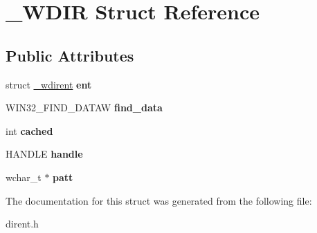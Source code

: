 \hypertarget{struct___w_d_i_r}{\section{\-\_\-\-W\-D\-I\-R Struct Reference}
\label{struct___w_d_i_r}
}
\subsection*{Public Attributes}
\begin{DoxyCompactItemize}
\item 
\hypertarget{struct___w_d_i_r_a84ae1457352005f813ed4b3dc1994b62}{struct \hyperlink{struct__wdirent}{\-\_\-wdirent} {\bfseries ent}}\label{struct___w_d_i_r_a84ae1457352005f813ed4b3dc1994b62}

\item 
\hypertarget{struct___w_d_i_r_a2e2f2680de3f93c30245e482d2b714fa}{W\-I\-N32\-\_\-\-F\-I\-N\-D\-\_\-\-D\-A\-T\-A\-W {\bfseries find\-\_\-data}}\label{struct___w_d_i_r_a2e2f2680de3f93c30245e482d2b714fa}

\item 
\hypertarget{struct___w_d_i_r_a9b7432df163d1e291ba5925347fd4af3}{int {\bfseries cached}}\label{struct___w_d_i_r_a9b7432df163d1e291ba5925347fd4af3}

\item 
\hypertarget{struct___w_d_i_r_a694510e166fd3e797b3e15b9e4b3810a}{H\-A\-N\-D\-L\-E {\bfseries handle}}\label{struct___w_d_i_r_a694510e166fd3e797b3e15b9e4b3810a}

\item 
\hypertarget{struct___w_d_i_r_a700ff3a1096fb36452c571b0f55b4e60}{wchar\-\_\-t $\ast$ {\bfseries patt}}\label{struct___w_d_i_r_a700ff3a1096fb36452c571b0f55b4e60}

\end{DoxyCompactItemize}


The documentation for this struct was generated from the following file\-:\begin{DoxyCompactItemize}
\item 
dirent.\-h\end{DoxyCompactItemize}
